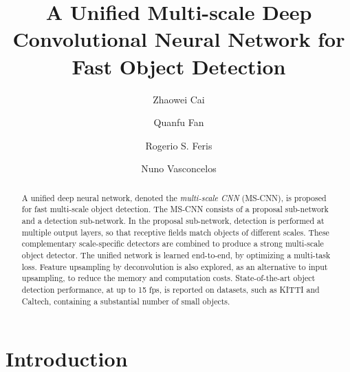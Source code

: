 \documentclass[runningheads]{llncs}
\begin{document}
\pagestyle{headings}
\mainmatter

\title{A Unified Multi-scale Deep Convolutional Neural Network for Fast Object Detection} 


\author{Zhaowei Cai\and Quanfu Fan\and Rogerio S. Feris\and Nuno Vasconcelos}




\maketitle

\begin{abstract}
A unified deep neural network, denoted the {\it multi-scale CNN\/} (MS-CNN),
is proposed for fast multi-scale object detection. The MS-CNN
consists of a proposal sub-network and a detection sub-network. In the
proposal sub-network, detection is performed at multiple output layers,
so that receptive fields match objects of different scales. These
complementary scale-specific detectors are combined to produce a strong
multi-scale object detector. The unified network is learned end-to-end, by
optimizing a multi-task loss. Feature upsampling by deconvolution is also
explored, as an alternative to input upsampling, to reduce the memory and
computation costs. State-of-the-art object detection performance, at up
to 15 fps, is reported on datasets, such as KITTI and Caltech, containing a substantial number of small objects.

\end{abstract}


\section{Introduction}
\end{document}
